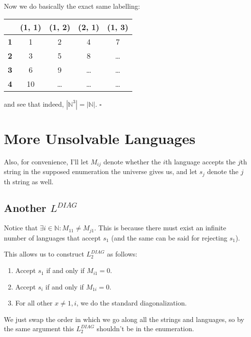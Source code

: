 \documentclass[12pt]{article}
\newcommand{\N}{\mathbb{N}}
\begin{document}
Now we do basically the exact same labelling:
\begin{center}
    \begin{tabular}{c|cccc}
                   & \textbf{(1, 1)} & \textbf{(1, 2)} & \textbf{(2, 1)} & \textbf{(1, 3)} \\ \hline
        \textbf{1} & 1               & 2               & 4               & 7               \\
        \textbf{2} & 3               & 5               & 8               & \ldots          \\
        \textbf{3} & 6               & 9               & \ldots          & \ldots          \\
        \textbf{4} & 10              & \ldots          & \ldots          & \ldots          \\
    \end{tabular}
\end{center}
and see that indeed, $\left|\N^3\right|=|\N|$. $\square$

\pagebreak

\section{More Unsolvable Languages}

Also, for convenience, I'll let $M_{ij}$ denote whether the $i$th language accepts
the $j$th string in the supposed enumeration the universe gives us,
and let $s_j$ denote the $j$th string as well.

\subsection{Another \texorpdfstring{$L^{DIAG}$}{L\^DIAG}}\label{sec:onemore}

Notice that $\exists i \in \N: M_{11} \ne M_{j1}$.
This is because there must exist an infinite number
of languages that accept $s_1$ (and the same can be said for rejecting $s_1$).

This allows us to construct $L_2^{DIAG}$ as follows:
\begin{enumerate}[nolistsep]
    \item Accept $s_1$ if and only if $M_{i1}=0$.
    \item Accept $s_i$ if and only if $M_{1i}=0$.
    \item For all other $x \ne 1, i$, we do the standard diagonalization.
\end{enumerate}
We just swap the order in which we go along all the strings and languages,
so by the same argument this $L_2^{DIAG}$ shouldn't be in the enumeration.
\end{document}
